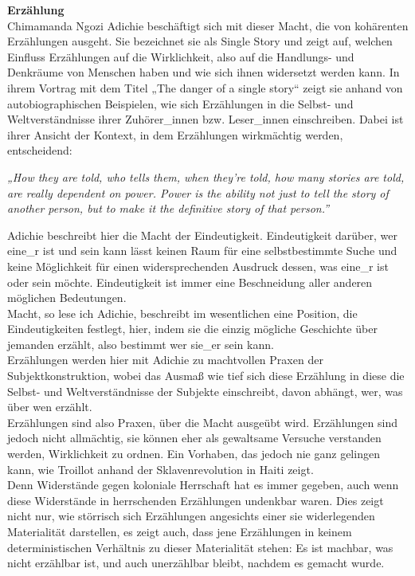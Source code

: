 \noindent\textbf{\large Erzählung}\\
Chimamanda Ngozi Adichie beschäftigt sich mit dieser Macht, die von kohärenten
Erzählungen ausgeht. Sie bezeichnet sie als Single Story und zeigt auf, welchen
Einfluss Erzählungen auf die Wirklichkeit, also auf die Handlungs- und Denkräume von
Menschen haben und wie sich ihnen widersetzt werden kann. In ihrem Vortrag mit
dem Titel „The danger of a single story“\footnotemark{} 
 zeigt sie anhand von
autobiographischen Beispielen, wie sich Erzählungen in die Selbst- und
Weltverständnisse ihrer Zuhörer\_innen bzw. Leser\_innen einschreiben. Dabei ist
ihrer Ansicht der Kontext, in dem Erzählungen wirkmächtig werden, entscheidend:

\begin{myenv}
  \textit{„How they are told, who tells them, when they're told, how many
stories are told, are really dependent on power. Power is the ability not just
to tell the story of another person, but to make it the definitive story of
that person.” \footnotemark{} } 
\end{myenv}
Adichie beschreibt hier die Macht der Eindeutigkeit. Eindeutigkeit darüber, wer
eine\_r ist und sein kann lässt keinen Raum für eine selbstbestimmte Suche und
keine Möglichkeit für einen widersprechenden Ausdruck dessen, was eine\_r ist oder
sein möchte. Eindeutigkeit ist immer eine Beschneidung aller anderen möglichen
Bedeutungen.\\
Macht, so lese ich Adichie, beschreibt im wesentlichen eine
Position, die Eindeutigkeiten festlegt, hier, indem sie die einzig mögliche
Geschichte über jemanden erzählt, also bestimmt wer sie\_er sein kann.\\

\noindent Erzählungen werden hier mit Adichie zu machtvollen Praxen der
Subjektkonstruktion, wobei das Ausmaß wie tief sich diese Erzählung in diese
die Selbst- und Weltverständnisse der Subjekte einschreibt, davon abhängt, wer,
was über wen erzählt.\\
Erzählungen sind also Praxen, über die Macht ausgeübt wird. Erzählungen sind
jedoch nicht allmächtig, sie können eher als gewaltsame Versuche verstanden
werden, Wirklichkeit zu ordnen. Ein Vorhaben, das jedoch nie ganz gelingen
kann, wie Troillot anhand der Sklavenrevolution in Haiti zeigt.\\
Denn Widerstände gegen koloniale Herrschaft hat es immer gegeben, auch wenn diese
Widerstände in  herrschenden Erzählungen undenkbar waren. Dies zeigt nicht nur,
wie störrisch sich Erzählungen angesichts einer sie widerlegenden Materialität
darstellen, es zeigt auch, dass jene Erzählungen in keinem deterministischen
Verhältnis zu dieser Materialität stehen: Es ist machbar, was nicht erzählbar
ist, und auch unerzählbar bleibt, nachdem es gemacht wurde.\\

